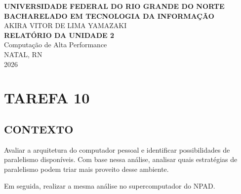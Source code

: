\documentclass[12pt, openright, oneside, a4paper, brazil]{article}
\newcommand{\subtUm}{CONTEXTO}
\begin{document}
	
	\begin{center}
		\thispagestyle{empty}
		\textbf{\uppercase{Universidade Federal do Rio Grande do Norte}}\\
		\textbf{\uppercase{Bacharelado em Tecnologia da Informação}}\\
		\vspace{4cm}
		AKIRA VITOR DE LIMA YAMAZAKI\\
		\vspace{5cm}
		\textbf{RELATÓRIO DA UNIDADE 2}\\
		Computação de Alta Performance\\
		\vspace{11cm}
		NATAL, RN\\
		2026\\
	\end{center}
	
	\newpage
		\onehalfspacing
		\section{TAREFA 10}
			\subsection{\subtUm}
				\par{Avaliar a arquitetura do computador pessoal e identificar possibilidades de paralelismo disponíveis. Com base nessa análise, analisar quais estratégias de paralelismo podem triar mais proveito desse ambiente.
				
				Em seguida, realizar a mesma análise no supercomputador do NPAD.}
\end{document}
